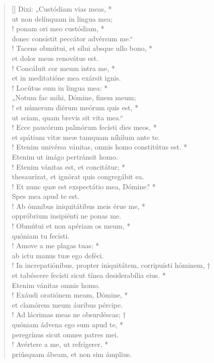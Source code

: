 \begin{verse}[\versewidth]
Dixi: „Custódiam vias meas, *\\
ut non delínquam in lingua mea;\\!
\vin ponam ori meo custódiam, *\\
\vin donec consístit peccátor advérsum me.“\\!
Tacens obmútui, et sílui absque ullo bono, *\\
et dolor meus renovátus est.\\!
\vin Concáluit cor meum intra me, *\\
\vin et in meditatióne mea exársit ignis.\\!
Locútus sum in lingua mea: *\\
„Notum fac mihi, Dómine, finem meum;\\!
\vin et númerum diérum meórum quis est, *\\
\vin ut sciam, quam brevis sit vita mea.“\\!
Ecce paucórum palmórum fecísti dies meos, *\\
et spátium vitæ meæ tamquam níhilum ante te.\\!
\vin Etenim univérsa vánitas, omnis homo constitútus est. *\\
\vin Etenim ut imágo pertránsit homo.\\!
Etenim vánitas est, et concitátur; *\\
thesaurízat, et ignórat quis congregábit ea.\\!
\vin Et nunc quæ est exspectátio mea, Dómine? *\\
\vin Spes mea apud te est.\\!
Ab ómnibus iniquitátibus meis érue me, *\\
oppróbrium insipiénti ne ponas me.\\!
\vin Obmútui et non apériam os meum, *\\
\vin quóniam tu fecísti.\\!
Amove a me plagas tuas: *\\
ab ictu manus tuæ ego deféci.\\!
\vin In increpatiónibus, propter iniquitátem, corripuísti hóminem, †\\
\vin et tabéscere fecísti sicut tínea desiderabília eius. *\\
\vin Etenim vánitas omnis homo.\\!
Exáudi oratiónem meam, Dómine, *\\
et clamórem meum áuribus pércipe.\\!
\vin Ad lácrimas meas ne obsurdéscas; †\\
\vin quóniam ádvena ego sum apud te, *\\
\vin peregrínus sicut omnes patres mei.\\!
Avértere a me, ut refrígerer, *\\
priúsquam ábeam, et non sim ámplius.\\
\end{verse}
\vspace{1cm}


